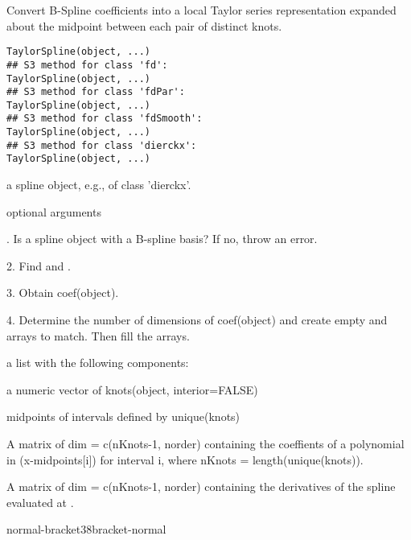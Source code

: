 \documentclass{article}
\begin{document}
\begin{Description}\relax
Convert B-Spline coefficients into a local Taylor series
representation expanded about the midpoint between each pair of
distinct knots.
\end{Description}
\begin{Usage}
\begin{verbatim}
TaylorSpline(object, ...)
## S3 method for class 'fd':
TaylorSpline(object, ...)
## S3 method for class 'fdPar':
TaylorSpline(object, ...)
## S3 method for class 'fdSmooth':
TaylorSpline(object, ...)
## S3 method for class 'dierckx':
TaylorSpline(object, ...)
\end{verbatim}
\end{Usage}
\begin{Arguments}
\begin{ldescription}
\item[\code{ object }] a spline object, e.g., of class 'dierckx'.

\item[\code{...}] optional arguments 
\end{ldescription}
\end{Arguments}
\begin{Details}.  Is  a spline object with a B-spline basis?  If no,
throw an error.

2.  Find  and .

3.  Obtain coef(object).

4.  Determine the number of dimensions of coef(object) and create
empty  and  arrays to match.  Then fill the
arrays.
\end{Details}
\begin{Value}
a list with the following components:

\begin{ldescription}
\item[\code{knots}] a numeric vector of knots(object, interior=FALSE)

\item[\code{midpoints}] midpoints of intervals defined by unique(knots)

\item[\code{coef}] A matrix of dim = c(nKnots-1, norder) containing the coeffients of
a polynomial in (x-midpoints[i]) for interval i, where nKnots =
length(unique(knots)).

\item[\code{deriv}] A matrix of dim = c(nKnots-1, norder) containing the derivatives
of the spline evaluated at .

\end{ldescription}

normal-bracket38bracket-normal
\end{Value}
\end{document}
